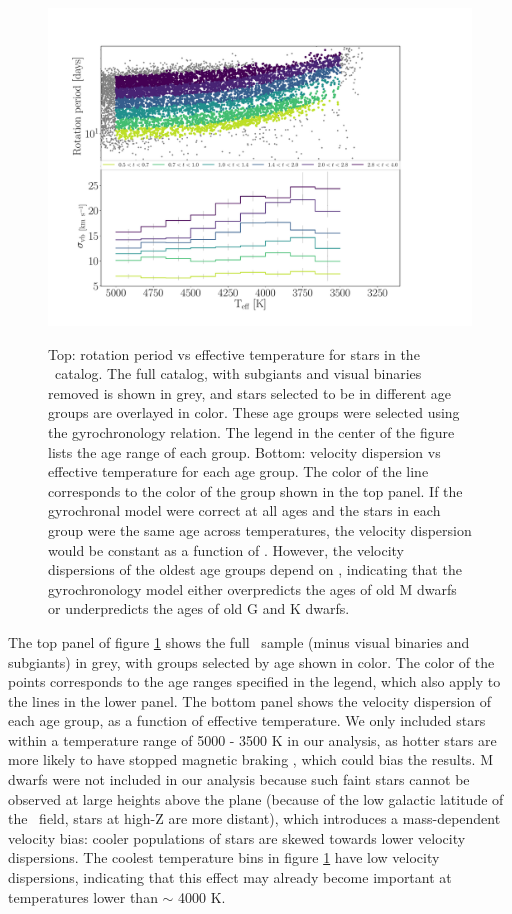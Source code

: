 \begin{figure}
  \caption{
Top: rotation period vs effective temperature for stars in the \mct\
    catalog.
    The full catalog, with subgiants and visual binaries removed is shown in
    grey, and stars selected to be in different age groups are overlayed in
    color.
    These age groups were selected using the \citet{angus2019} gyrochronology
    relation.
The legend in the center of the figure lists the age range of each group.
    Bottom: velocity dispersion vs effective temperature for each age group.
The color of the line corresponds to the color of the group shown in the top
    panel.
If the gyrochronal model were correct at all ages and the stars in each group
    were the same age across temperatures, the velocity dispersion would be
    constant as a function of \teff.
However, the velocity dispersions of the oldest age groups depend on \teff,
    indicating that the \citet{angus2019} gyrochronology model either
    overpredicts the ages of old M dwarfs or underpredicts the ages of old G
    and K dwarfs.
}
  \centering
    \includegraphics[width=1\textwidth]{age_cut}
\label{fig:age_cut}
\end{figure}
The top panel of figure \ref{fig:age_cut} shows the full \mct\ sample (minus
visual binaries and subgiants) in grey, with groups selected by age shown in
color.
The color of the points corresponds to the age ranges specified in the legend,
which also apply to the lines in the lower panel.
The bottom panel shows the velocity dispersion of each age group, as a
function of effective temperature.
We only included stars within a temperature range of 5000 - 3500 K in our
analysis, as hotter stars are more likely to have stopped magnetic braking
\citep{vansaders2016}, which could bias the results.
M dwarfs were not included in our analysis because such faint stars cannot be
observed at large heights above the plane (because of the low galactic
latitude of the \kepler\ field, stars at high-Z are more distant), which
introduces a mass-dependent velocity bias: cooler populations of stars are
skewed towards lower velocity dispersions.
The coolest temperature bins in figure \ref{fig:age_cut} have low velocity
dispersions, indicating that this effect may already become important at
temperatures lower than $\sim$ 4000 K.


